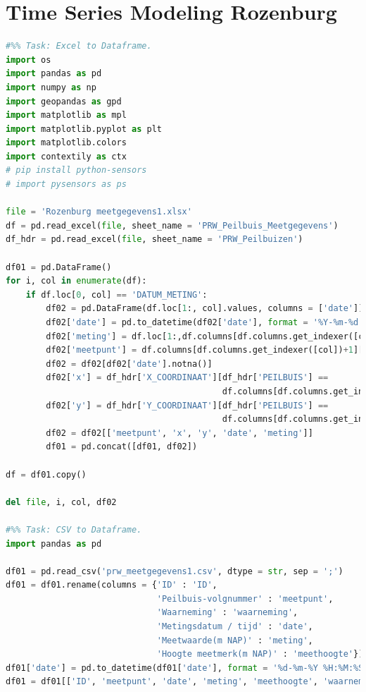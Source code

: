 \section{Time Series Modeling Rozenburg}
\begin{lstlisting}[language=Python]
#%% Task: Excel to Dataframe. 
import os 
import pandas as pd
import numpy as np
import geopandas as gpd 
import matplotlib as mpl
import matplotlib.pyplot as plt 
import matplotlib.colors
import contextily as ctx
# pip install python-sensors 
# import pysensors as ps 

file = 'Rozenburg meetgegevens1.xlsx'
df = pd.read_excel(file, sheet_name = 'PRW_Peilbuis_Meetgegevens')
df_hdr = pd.read_excel(file, sheet_name = 'PRW_Peilbuizen')
 
df01 = pd.DataFrame()
for i, col in enumerate(df):
    if df.loc[0, col] == 'DATUM_METING':
        df02 = pd.DataFrame(df.loc[1:, col].values, columns = ['date'])
        df02['date'] = pd.to_datetime(df02['date'], format = '%Y-%m-%d %H:%M:%S').dt.strftime('%Y-%m-%d')
        df02['meting'] = df.loc[1:,df.columns[df.columns.get_indexer([col])+1][0]].values
        df02['meetpunt'] = df.columns[df.columns.get_indexer([col])+1][0]
        df02 = df02[df02['date'].notna()]
        df02['x'] = df_hdr['X_COORDINAAT'][df_hdr['PEILBUIS'] == 
                                           df.columns[df.columns.get_indexer([col])+1][0]].values[0]
        df02['y'] = df_hdr['Y_COORDINAAT'][df_hdr['PEILBUIS'] == 
                                           df.columns[df.columns.get_indexer([col])+1][0]].values[0]
        df02 = df02[['meetpunt', 'x', 'y', 'date', 'meting']]
        df01 = pd.concat([df01, df02])

df = df01.copy()

del file, i, col, df02

#%% Task: CSV to Dataframe. 
import pandas as pd

df01 = pd.read_csv('prw_meetgegevens1.csv', dtype = str, sep = ';') 
df01 = df01.rename(columns = {'ID' : 'ID',
                              'Peilbuis-volgnummer' : 'meetpunt',
                              'Waarneming' : 'waarneming',
                              'Metingsdatum / tijd' : 'date',
                              'Meetwaarde(m NAP)' : 'meting',
                              'Hoogte meetmerk(m NAP)' : 'meethoogte'}) 
df01['date'] = pd.to_datetime(df01['date'], format = '%d-%m-%Y %H:%M:%S').dt.strftime('%Y-%m-%d')
df01 = df01[['ID', 'meetpunt', 'date', 'meting', 'meethoogte', 'waarneming']]


\end{lstlisting}
